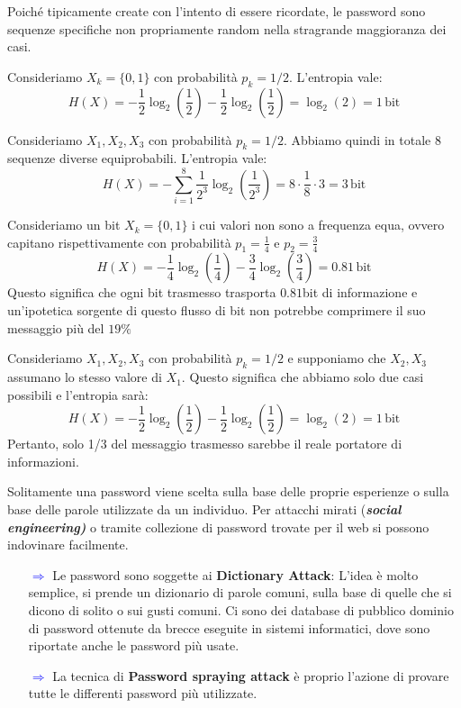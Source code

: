 \begin{definition}
Poiché tipicamente create con l'intento di essere ricordate, le password sono sequenze specifiche non propriamente random nella stragrande maggioranza dei casi.
\end{definition}
\begin{example}Consideriamo $X_k=\{0,1\}$ con probabilità $p_k=1/2$. L'entropia vale:\[H(X)=-\frac{1}{2}\log_{2}\left(\frac{1}{2}\right)-\frac{1}{2}\log_{2}\left(\frac{1}{2}\right)=\log_{2}(2)=1\,\text{bit}\]
\end{example}
\begin{example} Consideriamo $X_1,X_2,X_3$ con probabilità $p_k=1/2$. Abbiamo quindi in totale 8 sequenze diverse equiprobabili.
L'entropia vale: 
\[H(X)=-\sum_{i=1}^{8}\frac{1}{2^3}\log_{2}\left(\frac{1}{2^3}\right)=8\cdot\frac{1}{8}\cdot3=3\,\text{bit}\]
\end{example}
\begin{example}  Consideriamo un bit $X_k=\{0,1\}$ i cui valori non sono a frequenza equa, ovvero capitano rispettivamente con probabilità $p_1=\frac{1}{4}$ e $p_2=\frac{3}{4}$
\[H(X)=-\frac{1}{4}\log_{2}\left(\frac{1}{4}\right)-\frac{3}{4}\log_{2}\left(\frac{3}{4}\right)=0.81\,\text{bit}\]
Questo significa che ogni bit trasmesso trasporta $0.81$bit di informazione e un'ipotetica sorgente di questo flusso di bit non potrebbe comprimere il suo messaggio più del $19\%$
\end{example}\pagebreak
\begin{example} Consideriamo $X_1,X_2,X_3$ con probabilità $p_k=1/2$ e supponiamo che $X_2,X_3$ assumano lo stesso valore di $X_1$. Questo significa che abbiamo solo due casi possibili e l'entropia sarà:
\[H(X)=-\frac{1}{2}\log_{2}\left(\frac{1}{2}\right)-\frac{1}{2}\log_{2}\left(\frac{1}{2}\right)=\log_{2}(2)=1\,\text{bit}\]
Pertanto, solo 1/3 del messaggio trasmesso sarebbe il reale portatore di informazioni.
\end{example}
\begin{definition}[Predictability]
Solitamente una password viene scelta sulla base delle proprie esperienze o sulla base delle parole utilizzate da un individuo. Per attacchi mirati (\textit{\textbf{social engineering)}} o tramite collezione di password trovate per il web si possono indovinare facilmente.
\end{definition}
\begin{itemize}
    \item [\textcolor{blue}{$\Rightarrow$}]Le password sono soggette ai \textbf{Dictionary Attack}: L'idea è molto semplice, si prende un dizionario di parole comuni, sulla base di quelle che si dicono di solito o sui gusti comuni. Ci sono dei database di pubblico dominio di password ottenute da brecce eseguite in sistemi informatici, dove sono riportate anche le password più usate. 
    \item [\textcolor{blue}{$\Rightarrow$}]La tecnica di \textbf{Password spraying attack} è proprio l’azione di provare tutte le differenti password più utilizzate.
\end{itemize}
